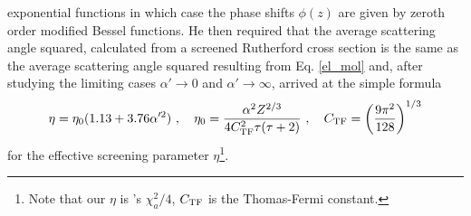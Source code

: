 exponential functions in which case the phase shifts $\phi(z)$ are 
given by zeroth order modified Bessel functions. He then required 
that the average scattering angle squared, calculated from a 
screened Rutherford cross section is the same as the average 
scattering angle squared resulting from Eq. \eqref{el_mol} and, 
after studying the limiting cases $\alpha' \to 0$ and 
$\alpha' \to \infty$, arrived at the simple formula 
\begin{equation}
\label{eta_0}
\eta = \eta_0 (1.13 + 3.76 \alpha^{\prime 2} )~, \quad 
\eta_0 = {\alpha^2 Z^{2/3} \over 4 C_{\rm TF}^2 \tau (\tau + 2)}~, 
\quad C_{\rm TF} = \left( {9 \pi^2 \over 128} \right)^{1/3}
\end{equation}
for the effective screening parameter $\eta$\footnote{Note that our 
$\eta$ is \Mol's $\chi_a^2/4$, $C_{\rm TF}$ is the Thomas-Fermi 
constant.}. 

